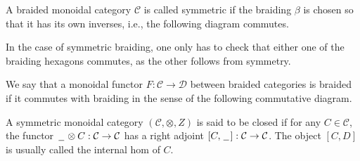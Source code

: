 \documentclass[../thesis.tex]{subfiles}
\begin{document}
        \begin{definition}
            A braided monoidal category $\mathcal{C}$ is called symmetric if the braiding $\beta$ is chosen so that it has its own inverses, i.e., the following diagram commutes.
            \begin{center}
            \end{center}
        \end{definition}

        In the case of symmetric braiding, one only has to check that either one of the braiding hexagons commutes, as the other follows from symmetry.

        \begin{definition}
            We say that a monoidal functor $F: \mathcal{C} \rightarrow \mathcal{D}$ between braided categories is braided if it commutes with braiding in the sense of the following commutative diagram.
            \begin{center}
            \end{center}
        \end{definition}

        \begin{definition}
            A symmetric monoidal category $(\mathcal{C}, \otimes, Z)$ is said to be closed if for any $C \in \mathcal{C}$, the functor $\hspace{0.05cm}\underline{\hspace{0.2cm}}\hspace{0.05cm} \otimes C : \mathcal{C} \rightarrow \mathcal{C}$ has a right adjoint $[C, \hspace{0.05cm}\underline{\hspace{0.2cm}}\hspace{0.05cm}] : \mathcal{C} \rightarrow \mathcal{C}$. The object $[C, D]$ is usually called the internal hom of $C$.
        \end{definition}
\end{document}
